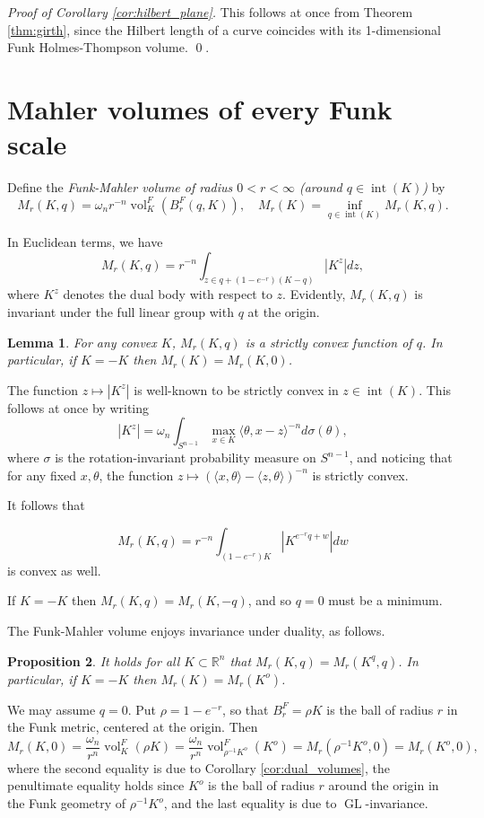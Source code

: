 \documentclass[reqno,10pt]{amsart}
\newcounter{mp}
\newtheorem{Proposition}{Proposition}[section]
\newtheorem{Lemma}[Proposition]{Lemma}
\DeclareMathOperator{\inter}{int}
\DeclareMathOperator{\vol}{vol}
\DeclareMathOperator{\GL}{GL}
\newcommand{\R}{\mathbb{R}}
\begin{document}
\textit{Proof of Corollary \ref{cor:hilbert_plane}.}
This follows at once from Theorem \ref{thm:girth}, since the Hilbert length of a curve coincides with its 1-dimensional Funk Holmes-Thompson volume.
\qed.


\section{Mahler volumes of every Funk scale}\label{sec:every_scale}
Define the \emph{Funk-Mahler volume of radius $0<r<\infty$ (around $q\in \inter(K)$)} by $$M_r(K,q)=\omega_n r^{-n}\vol_K^F(B_r^F(q, K)), \quad  M_r(K)=\inf_{q\in \inter(K)}M_r(K,q).$$

In Euclidean terms, we have $$M_r(K,q)=r^{-n}\int_{z\in q+(1-e^{-r})(K-q)}|K^z|dz,$$  where $K^z$ denotes the dual body with respect to $z$. Evidently, $M_r(K,q)$ is invariant under the full linear group with $q$ at the origin. 

\begin{Lemma}\label{lem:mahler_convex}
	For any convex $K$, $M_r(K, q)$ is a strictly convex function of $q$. In particular, if $K=-K$ then $M_r(K)=M_r(K, 0)$.
\end{Lemma}
\proof
The function $z\mapsto |K^z|$ is well-known to be strictly convex in $z\in \inter(K)$. This follows at once by writing 
$$|K^z|=\omega_n\int_{S^{n-1}}\max_{x\in K}\langle \theta, x-z\rangle ^{-n}d\sigma(\theta),$$
where $\sigma$ is the rotation-invariant probability measure on $S^{n-1}$, and noticing that for any fixed $x,\theta$, the function $z\mapsto (\langle x,\theta\rangle -\langle z, \theta\rangle)^{-n}$ is strictly convex.

It follows that

$$M_r(K,q)=r^{-n}\int_{(1-e^{-r})K}|K^{e^{-r}q+w}|dw$$ is convex as well.

If $K=-K$ then $M_r(K, q)=M_r(K, -q)$, and so $q=0$ must be a minimum.

\endproof

The Funk-Mahler volume enjoys invariance under duality, as follows.

\begin{Proposition}
	It holds for all $K\subset \R^n$ that $M_r(K, q)=M_r(K^q, q)$. In particular, if $K=-K$ then $M_r(K)=M_r(K^o)$.
\end{Proposition}
\proof
We may assume $q=0$. Put $\rho=1-e^{-r}$, so that $B_r^F=\rho K$ is the ball of radius $r$ in the Funk metric, centered at the origin. Then  $$M_r(K,0)=\frac{\omega_n}{r^n}\vol_K^F(\rho K)=\frac{\omega_n}{r^n}\vol_{\rho^{-1} K^o}^F(K^o)=M_r(\rho^{-1}K^o,0)=M_r(K^o, 0),$$ where the second equality is due to Corollary \ref{cor:dual_volumes}, the penultimate equality holds since $K^o$ is the ball of radius $r$ around the origin in the Funk geometry of $\rho^{-1}K^o$, and the last equality is due to $\GL$-invariance.
\end{document}
